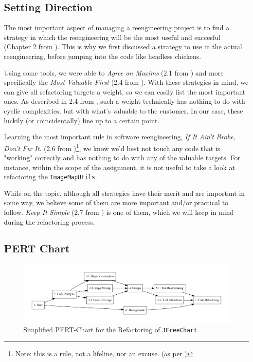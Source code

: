 \documentclass[11pt]{article}
\begin{document}
	\subsection{Setting Direction}
	The most important aspect of managing a reengineering project is to find a strategy in which the reengineering will be the most useful and succesful (Chapter 2 from \cite{demeyer2009object}). This is why we first discussed a strategy to use in the actual reengineering, before jumping into the code like headless chickens.
	
	Using some tools, we were able to \textsl{Agree on Maxims} (2.1 from \cite{demeyer2009object}) and more specifically the \textsl{Most Valuable First} (2.4 from \cite{demeyer2009object}). With these strategies in mind, we can give all refactoring targets a weight, so we can easily list the most important ones. As described in 2.4 from \cite{demeyer2009object}, such a weight technically has nothing to do with cyclic complexities, but with what's valuable to the customer. In our case, these luckily (or coincidentally) line up to a certain point.
	
	Learning the most important rule in software reengineering,
	\textsl{If It Ain't Broke, Don't Fix It.} (2.6 from \cite{demeyer2009object})\footnote{Note: this is a rule, not a lifeline, nor an excuse. (as per \cite{demeyer2009object})}, we know we'd best not touch any code that is "working" correctly and has nothing to do with any of the valuable targets. For instance, within the scope of the assignment, it is not useful to take a look at refactoring the \texttt{ImageMapUtils}.
	
	While on the topic, although all strategies have their merit and are important in some way, we believe some of them are more important and/or practical to follow. \textsl{Keep It Simple} (2.7 from \cite{demeyer2009object}) is one of them, which we will keep in mind during the refactoring process.
	
	\subsection{PERT Chart} 
	\begin{figure}[H] 
		\centering 
		\includegraphics[width=\textwidth]{pert.pdf}
		\caption{Simplified PERT-Chart for the Refactoring of \texttt{JFreeChart}} 
		\label{pert} 
	\end{figure} 
   
\end{document}
